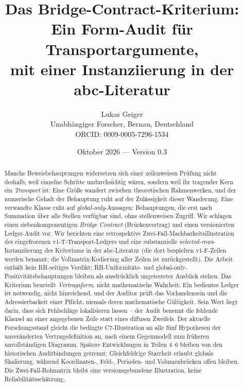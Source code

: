 \documentclass[11pt,a4paper]{article}
\title{Das Bridge-Contract-Kriterium:\\Ein Form-Audit für Transportargumente,\\mit einer Instanziierung in der abc-Literatur}
\author{Lukas Geiger\\\small Unabhängiger Forscher, Bernau, Deutschland\\\small ORCID: 0009-0005-7296-1534}
\date{Oktober 2026 --- Version 0.3}
\begin{document}
\maketitle

\begin{abstract}
Manche Beweisbehauptungen widersetzen sich einer zeilenweisen Prüfung nicht
deshalb, weil einzelne Schritte undurchsichtig wären, sondern weil ihr
tragender Kern ein \emph{Transport} ist: Eine Größe wandert zwischen
theoretischen Rahmenwerken, und der numerische Gehalt der Behauptung ruht auf
der Zulässigkeit dieser Wanderung. Eine verwandte Klasse ruht auf
\emph{global-only}-Aussagen: Behauptungen, die erst nach Summation über alle
Stellen verfügbar sind, ohne stellenweisen Zugriff. Wir schlagen einen
siebenkomponentigen \emph{Bridge Contract} (Brückenvertrag) und einen
versionierten Ledger-Audit vor. Wir berichten eine retrospektive
Zwei-Fall-Machbarkeitsillustration des eingefrorenen
v1-T-Transport-Ledgers und eine substanzielle
\emph{selected-rows}-Instanziierung des Kriteriums in der abc-Literatur (die
dort bespielten v1-F-Zeilen werden benannt; die Vollmatrix-Kodierung aller
Zeilen ist zurückgestellt). Die Arbeit enthält kein RH-seitiges Verdikt;
RH-Uniformitäts- und global-only-Positivitätsbehauptungen bleiben als
ausdrücklich ungetesteter Ausblick stehen. Das Kriterium beurteilt
\emph{Vertragsform}, nicht mathematische Wahrheit: Ein bedientes Ledger ist
notwendig, nicht hinreichend, und der Auditor prüft das Vorhandensein und die
Adressierbarkeit einer Pflicht, niemals deren mathematische Gültigkeit. Sein
Wert liegt darin, dass sich Fehlschläge lokalisieren lassen -- der Audit benennt die
fehlende Klausel an einer angegebenen Zeile statt eines diffusen Zweifels.
Der aktuelle Forschungsstand gleicht die bedingte C7-Illustration an alle
fünf Hypothesen der unveränderten Vertragsdefinition an, nach einem
Gegenmodell zum früheren unvollständigen Diagramm. Spätere Entwicklungen
in Teilen 4--6 bleiben von den historischen Auditbindungen getrennt:
Gleichfeldrige Starrheit erlaubt globale Skalierung, während Koordinaten-,
Feld-, Perioden- und Volumenbrücken offen bleiben. Die Zwei-Fall-Rohmatrix
bleibt eine versionsgebundene Illustration, keine Reliabilitätsschätzung.
\end{abstract}

\clearpage
\begingroup\sloppy
\tableofcontents
\endgroup
\clearpage

\end{document}
